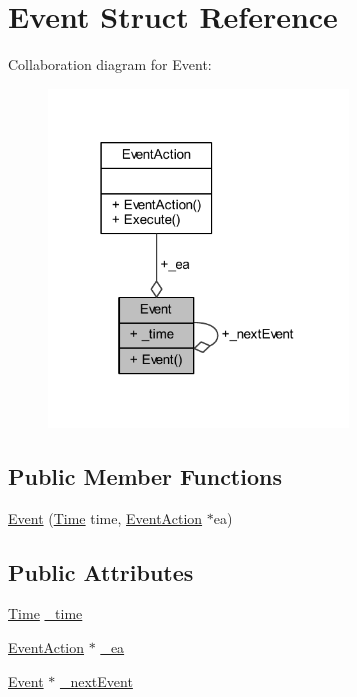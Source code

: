 \hypertarget{struct_event}{}\section{Event Struct Reference}
\label{struct_event}


Collaboration diagram for Event\+:\nopagebreak
\begin{figure}[H]
\begin{center}
\leavevmode
\includegraphics[width=226pt]{struct_event__coll__graph}
\end{center}
\end{figure}
\subsection*{Public Member Functions}
\begin{DoxyCompactItemize}
\item 
\hyperlink{struct_event_a5236b45d6ac7c6ce784c3e39fed03d7d}{Event} (\hyperlink{_simulation_executive_8h_ac2d3e0ba793497bcca555c7c2cf64ff3}{Time} time, \hyperlink{class_event_action}{Event\+Action} $\ast$ea)
\end{DoxyCompactItemize}
\subsection*{Public Attributes}
\begin{DoxyCompactItemize}
\item 
\hyperlink{_simulation_executive_8h_ac2d3e0ba793497bcca555c7c2cf64ff3}{Time} \hyperlink{struct_event_a7077d3af8bbf3d40e3c4570cc4675512}{\+\_\+time}
\item 
\hyperlink{class_event_action}{Event\+Action} $\ast$ \hyperlink{struct_event_aacbbfbf051167338e9febaaa5aad5b73}{\+\_\+ea}
\item 
\hyperlink{struct_event}{Event} $\ast$ \hyperlink{struct_event_a6bc8ec440b4f0b617d58af059e44e43e}{\+\_\+next\+Event}
\end{DoxyCompactItemize}


